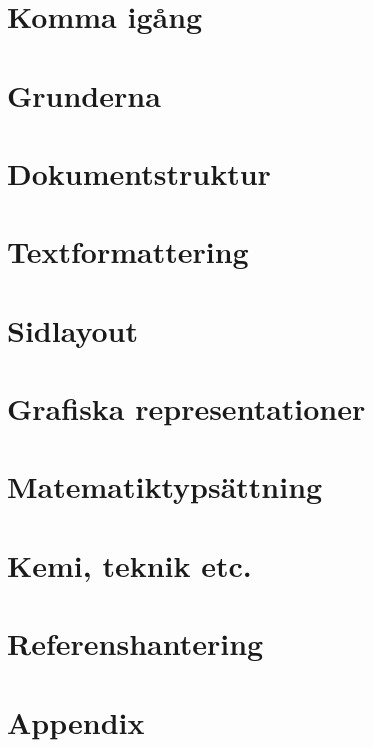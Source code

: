 \pagestyle{plain}

\setcounter{page}{1}
\chapter{Komma igång}\label{sec:intro}


\chapter{Grunderna}\label{sec:grunder}



\chapter{Dokumentstruktur}\label{sec:dokstruk}


\chapter{Textformattering}\label{sec:text}


\chapter{Sidlayout}\label{sec:sidor}


\chapter{Grafiska representationer}\label{sec:grafik}


\chapter{Matematiktypsättning}\label{sec:math}


\chapter{Kemi, teknik etc.}\label{sec:kemi}


\chapter{Referenshantering}\label{sec:referenser}


\appendix
\chapter{Appendix}\label{sec:appendix}
